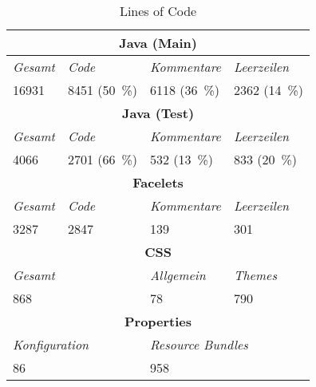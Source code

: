
\begin{table}
    \centering
    \caption{Lines of Code}
    \label{tab:loc}
    \begin{tabular}{llll}
        \toprule
        \multicolumn{4}{c}{\textbf{Java (Main)}} \\
        \midrule
        \textit{Gesamt} & \textit{Code} & \textit{Kommentare} & \textit{Leerzeilen}\\
        16931 & 8451 (50~\%) & 6118 (36~\%) & 2362 (14~\%) \\
        \midrule

        \multicolumn{4}{c}{\textbf{Java (Test)}} \\
        \midrule
        \textit{Gesamt} & \textit{Code} & \textit{Kommentare} & \textit{Leerzeilen}\\
        4066 & 2701 (66~\%) & 532 (13~\%) & 833 (20~\%) \\
        \midrule

        \multicolumn{4}{c}{\textbf{Facelets}} \\
        \midrule
        \textit{Gesamt} & \textit{Code} & \textit{Kommentare} & \textit{Leerzeilen}\\
        3287 & 2847 & 139 & 301 \\
        \midrule

        \multicolumn{4}{c}{\textbf{CSS}} \\
        \midrule
        \multicolumn{2}{l}{\textit{Gesamt}} & \multicolumn{1}{l}{\textit{Allgemein}} & \multicolumn{1}{l}{\textit{Themes}} \\
        \multicolumn{2}{l}{868} & 78 & 790 \\
        \midrule

        \multicolumn{4}{c}{\textbf{Properties}} \\
        \midrule
        \multicolumn{2}{l}{\textit{Konfiguration}} & \multicolumn{2}{l}{\textit{Resource Bundles}} \\
        \multicolumn{2}{l}{86} & \multicolumn{2}{l}{958} \\
        \bottomrule

    \end{tabular}
\end{table}
